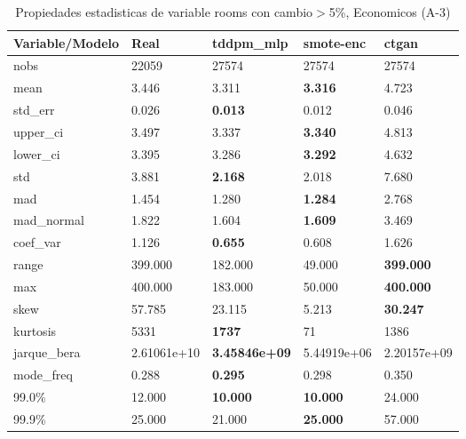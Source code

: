 \begin{table}[H]
\centering
\fontsize{8}{14}\selectfont
\caption{Propiedades estadisticas de variable rooms con cambio\ensuremath{>}5\%, Economicos (A-3)}
\label{table-stats-economicos-a-3-rooms-short}
\begin{tabular}{|l|m{10em}|m{10em}|m{10em}|m{10em}|}
\hline
 \rowcolor[gray]{0.8}
Variable/Modelo & Real & tddpm\_mlp & smote-enc & ctgan \\
\hline nobs & 22059 & 27574 & 27574 & 27574 \\
\hline mean & 3.446 & 3.311 & \bfseries 3.316 & \cellcolor[rgb]{0.9, 0.54, 0.52} 4.723 \\
\hline std\_err & 0.026 & \bfseries 0.013 & 0.012 & \cellcolor[rgb]{0.9, 0.54, 0.52} 0.046 \\
\hline upper\_ci & 3.497 & 3.337 & \bfseries 3.340 & \cellcolor[rgb]{0.9, 0.54, 0.52} 4.813 \\
\hline lower\_ci & 3.395 & 3.286 & \bfseries 3.292 & \cellcolor[rgb]{0.9, 0.54, 0.52} 4.632 \\
\hline std & 3.881 & \bfseries 2.168 & 2.018 & \cellcolor[rgb]{0.9, 0.54, 0.52} 7.680 \\
\hline mad & 1.454 & 1.280 & \bfseries 1.284 & \cellcolor[rgb]{0.9, 0.54, 0.52} 2.768 \\
\hline mad\_normal & 1.822 & 1.604 & \bfseries 1.609 & \cellcolor[rgb]{0.9, 0.54, 0.52} 3.469 \\
\hline coef\_var & 1.126 & \bfseries 0.655 & \cellcolor[rgb]{0.9, 0.54, 0.52} 0.608 & 1.626 \\
\hline range & 399.000 & 182.000 & \cellcolor[rgb]{0.9, 0.54, 0.52} 49.000 & \bfseries 399.000 \\
\hline max & 400.000 & 183.000 & \cellcolor[rgb]{0.9, 0.54, 0.52} 50.000 & \bfseries 400.000 \\
\hline skew & 57.785 & 23.115 & \cellcolor[rgb]{0.9, 0.54, 0.52} 5.213 & \bfseries 30.247 \\
\hline kurtosis & 5331 & \bfseries 1737 & \cellcolor[rgb]{0.9, 0.54, 0.52} 71 & 1386 \\
\hline jarque\_bera & 2.61061e+10 & \bfseries 3.45846e+09 & \cellcolor[rgb]{0.9, 0.54, 0.52} 5.44919e+06 & 2.20157e+09 \\
\hline mode\_freq & 0.288 & \bfseries 0.295 & 0.298 & \cellcolor[rgb]{0.9, 0.54, 0.52} 0.350 \\
\hline 99.0\% & 12.000 & \bfseries 10.000 & \bfseries 10.000 & \cellcolor[rgb]{0.9, 0.54, 0.52} 24.000 \\
\hline 99.9\% & 25.000 & 21.000 & \bfseries 25.000 & \cellcolor[rgb]{0.9, 0.54, 0.52} 57.000 \\
\hline
\end{tabular}
\end{table}
